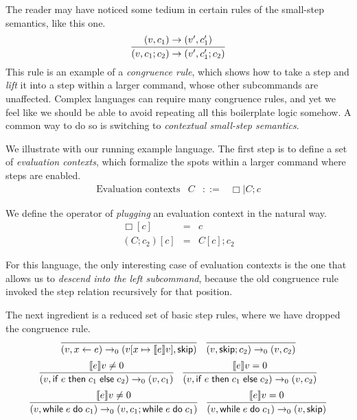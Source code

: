 \documentclass{amsbook}
\theoremstyle{definition}
\theoremstyle{remark}
\numberwithin{section}{chapter}
\numberwithin{equation}{chapter}
\begin{document}
The reader may have noticed some tedium in certain rules of the small-step semantics, like this one.
$$\infer{\smallstep{(v, c_1; c_2)}{(v', c'_1; c_2)}}{
    \smallstep{(v, c_1)}{(v', c'_1)}
}$$
This rule is an example of a \emph{congruence rule}, which shows how to take a step and \emph{lift} it into a step within a larger command, whose other subcommands are unaffected.
Complex languages can require many congruence rules, and yet we feel like we should be able to avoid repeating all this boilerplate logic somehow.
A common way to do so is switching to \emph{contextual small-step semantics}.

We illustrate with our running example language.
The first step is to define a set of \emph{evaluation contexts}, which formalize the spots within a larger command where steps are enabled.
\encoding
$$\begin{array}{rrcl}
  \textrm{Evaluation contexts} & C &::=& \Box \mid C; c
\end{array}$$

\newcommand{\plug}[2]{#1[#2]}
We define the operator of \emph{plugging} an evaluation context in the natural way.
\begin{eqnarray*}
  \plug{\Box}{c} &=& c \\
  \plug{(C; c_2)}{c} &=& \plug{C}{c}; c_2
\end{eqnarray*}

For this language, the only interesting case of evaluation contexts is the one that allows us to \emph{descend into the left subcommand}, because the old congruence rule invoked the step relation recursively for that position.

\newcommand{\smallstepo}[2]{#1 \to_0 #2}

The next ingredient is a reduced set of basic step rules, where we have dropped the congruence rule.
$$\infer{\smallstepo{(v, \assign{x}{e})}{(\mupd{v}{x}{\denote{e}v}, \skipe)}}{}
\quad \infer{\smallstepo{(v, \skipe; c_2)}{(v, c_2)}}{}$$
$$\infer{\smallstepo{(v, \ifte{e}{c_1}{c_2})}{(v, c_1)}}{
  \denote{e}v \neq 0
}
\quad \infer{\smallstepo{(v, \ifte{e}{c_1}{c_2})}{(v, c_2)}}{
  \denote{e}v = 0
}$$
$$\infer{\smallstepo{(v, \while{e}{c_1})}{(v, c_1; \while{e}{c_1})}}{
  \denote{e}v \neq 0
}
\quad \infer{\smallstepo{(v, \while{e}{c_1})}{(v, \skipe)}}{
  \denote{e}v = 0
}$$

\newcommand{\smallstepc}[2]{#1 \to_\mathsf{c} #2}
\end{document}
